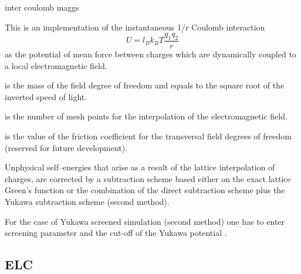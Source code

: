 \begin{essyntax}
  inter coulomb 
  maggs   
  \begin{features}
  \end{features}
\end{essyntax}

This is an implementation of the instantaneous 1/r Coulomb interaction
\begin{equation}
  U = l_B k_B T \frac{q_1 q_2}{r}
\end{equation}
as the potential of mean force between charges which are dynamically
coupled to a local electromagnetic field.

\begin{arguments}
\item[\var{f\_mass}] is the mass of the field degree of freedom and equals
  to the square root of the inverted speed of light.
\item[\var{mesh}] is the number of mesh points for the interpolation
  of the electromagnetic field.
\item[\var{field\_friction}] is the value of the friction coefficient
  for the transversal field degrees of freedom (reserved for future
  development).
\end{arguments}
Unphysical self--energies that arise as a result of the lattice
interpolation of charges, are corrected by a subtraction scheme based
either on the exact lattice Green's function or the combination of the
direct subtraction scheme plus the Yukawa subtraction scheme (second
method).

For the case of Yukawa screened simulation (second method) one has to
enter screening parameter  and the cut-off of the Yukawa
potential .

\subsection{ELC}

